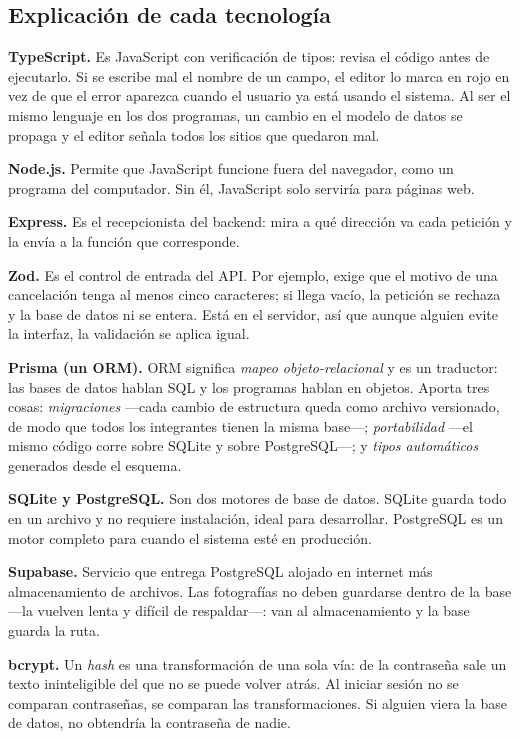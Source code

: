 \subsection{Explicación de cada tecnología}

\textbf{TypeScript.} Es JavaScript con verificación de tipos: revisa el código
antes de ejecutarlo. Si se escribe mal el nombre de un campo, el editor lo marca
en rojo en vez de que el error aparezca cuando el usuario ya está usando el
sistema. Al ser el mismo lenguaje en los dos programas, un cambio en el modelo de
datos se propaga y el editor señala todos los sitios que quedaron mal.

\textbf{Node.js.} Permite que JavaScript funcione fuera del navegador, como un
programa del computador. Sin él, JavaScript solo serviría para páginas web.

\textbf{Express.} Es el recepcionista del backend: mira a qué dirección va cada
petición y la envía a la función que corresponde.

\textbf{Zod.} Es el control de entrada del API. Por ejemplo, exige que el motivo de
una cancelación tenga al menos cinco caracteres; si llega vacío, la petición se
rechaza y la base de datos ni se entera. Está en el servidor, así que aunque
alguien evite la interfaz, la validación se aplica igual.

\textbf{Prisma (un ORM).} ORM significa \emph{mapeo objeto-relacional} y es un
traductor: las bases de datos hablan SQL y los programas hablan en objetos. Aporta
tres cosas: \emph{migraciones} —cada cambio de estructura queda como archivo
versionado, de modo que todos los integrantes tienen la misma base—;
\emph{portabilidad} —el mismo código corre sobre SQLite y sobre PostgreSQL—; y
\emph{tipos automáticos} generados desde el esquema.

\textbf{SQLite y PostgreSQL.} Son dos motores de base de datos. SQLite guarda todo
en un archivo y no requiere instalación, ideal para desarrollar. PostgreSQL es un
motor completo para cuando el sistema esté en producción.

\textbf{Supabase.} Servicio que entrega PostgreSQL alojado en internet más
almacenamiento de archivos. Las fotografías no deben guardarse dentro de la base
—la vuelven lenta y difícil de respaldar—: van al almacenamiento y la base guarda
la ruta.

\textbf{bcrypt.} Un \emph{hash} es una transformación de una sola vía: de la
contraseña sale un texto ininteligible del que no se puede volver atrás. Al
iniciar sesión no se comparan contraseñas, se comparan las transformaciones. Si
alguien viera la base de datos, no obtendría la contraseña de nadie.

